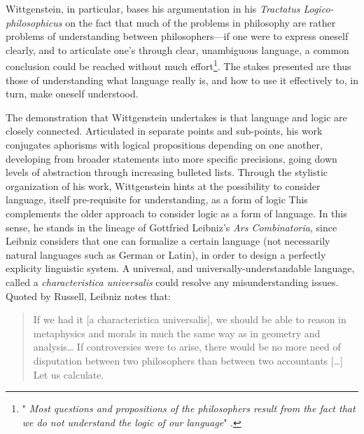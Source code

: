 Wittgenstein, in particular, bases his argumentation in his \emph{Tractatus Logico-philosophicus} on the fact that much of the problems in philosophy are rather problems of understanding between philosophers—if one were to express oneself clearly, and to articulate one's through clear, unambiguous language, a common conclusion could be reached without much effort\footnote{"\emph{    Most questions and propositions of the philosophers result from the fact that we do not understand the logic of our language}" \citep{wittgenstein_tractatus_2010}.}. The stakes presented are thus those of understanding what language really is, and how to use it effectively to, in turn, make oneself understood.

The demonstration that Wittgenstein undertakes is that language and logic are closely connected. Articulated in separate points and sub-points, his work conjugates aphorisms with logical propositions depending on one another, developing from broader statements into more specific precisions, going down levels of abstraction through increasing bulleted lists. Through the stylistic organization of his work, Wittgenstein hints at the possibility to consider language, itself pre-requisite for understanding, as a form of logic This complements the older approach to consider logic as a form of language. In this sense, he stands in the lineage of Gottfried Leibniz's \emph{Ars Combinatoria}, since Leibniz considers that one can formalize a certain language (not necessarily natural languages such as German or Latin), in order to design a perfectly explicity linguistic system. A universal, and universally-understandable language, called a \emph{characteristica universalis} could resolve any misunderstanding issues. Quoted by Russell, Leibniz notes that:

\begin{quote}
    If we had it [a characteristica universalis], we should be able to reason in metaphysics and morals in much the same way as in geometry and analysis\dots{} If controversies were to arise, there would be no more need of disputation between two philosophers than between two accountants [\dots] Let us calculate. \citep{russell_logical_1950}
\end{quote}

